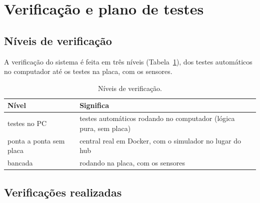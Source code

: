 \section{Verificação e plano de testes}\label{sec:verificacao}
\subsection{Níveis de verificação}

A verificação do sistema é feita em três níveis (Tabela~\ref{tab:niveis}), dos testes
automáticos no computador até os testes na placa, com os sensores.

\begin{table}[H]
\centering
\caption{Níveis de verificação.}
\label{tab:niveis}
\small
\begin{tabular}{@{}l>{\raggedright\arraybackslash}p{11.0cm}@{}}
\toprule
Nível & Significa \\
\midrule
testes no PC & testes automáticos rodando no computador (lógica pura, sem placa) \\
ponta a ponta sem placa & central real em Docker, com o simulador no lugar do hub \\
bancada & rodando na placa, com os sensores \\
\bottomrule
\end{tabular}
\end{table}

\subsection{Verificações realizadas}

